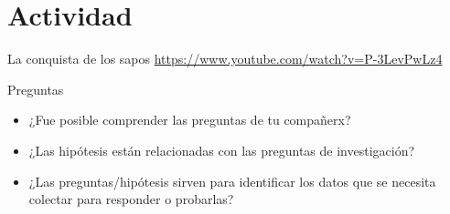 \documentclass[
  11pt,
  ignorenonframetext,
]{beamer}
\begin{document}
\hypertarget{actividad}{%
\section{Actividad}\label{actividad}}

\begin{frame}{La conquista de los sapos}
\protect\hypertarget{la-conquista-de-los-sapos}{}
\url{https://www.youtube.com/watch?v=P-3LevPwLz4}
\end{frame}

\begin{frame}{Preguntas}
\protect\hypertarget{preguntas-1}{}
\begin{itemize}
\item
  ¿Fue posible comprender las preguntas de tu compañerx?
\item
  ¿Las hipótesis están relacionadas con las preguntas de investigación?
\item
  ¿Las preguntas/hipótesis sirven para identificar los datos que se
  necesita colectar para responder o probarlas?
\end{itemize}
\end{frame}
\end{document}
